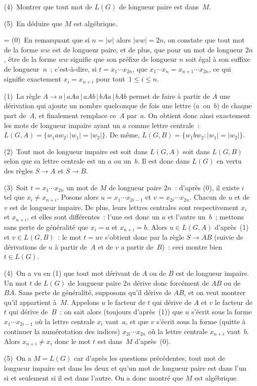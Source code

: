 \documentclass[12pt,a4paper]{article}
\theoremstyle{definition}
\newif\ifcorrige
\newenvironment{corrige}%
{\ifcorrige\relax\else\setbox0=\vbox\bgroup\fi%
\smallbreak\footnotesize\noindent{\underbar{\textit{Corrigé.}}\quad}}
{{\hbox{}\nobreak\hfill\checkmark}%
\ifcorrige\relax\else\egroup\fi\par}
\begin{document}
(4) Montrer que tout mot de $L(G)$ de longueur paire est dans $M$.

(5) En déduire que $M$ est algébrique.

\begin{corrige}
(0) En remarquant que si $n = |w|$ alors $|ww| = 2n$, on constate que
  tout mot de la forme $ww$ est de longueur paire, et de plus, que
  pour un mot de longueur $2n$, être de la forme $ww$ signifie que son
  préfixe de longueur $n$ soit égal à son suffixe de longueur $n$ ;
  c'est-à-dire, si $t = x_1\cdots x_{2n}$, que $x_1\cdots x_n =
  x_{n+1}\cdots x_{2n}$, ce qui signifie exactement $x_i = x_{n+i}$
  pour tout $1\leq i\leq n$.

(1) La règle $A \rightarrow a \,|\, aAa \,|\, aAb \,|\, bAa \,|\, bAb$
  permet de faire à partir de $A$ une dérivation qui ajoute un nombre
  quelconque de fois une lettre ($a$ ou $b$) de chaque part de $A$, et
  finalement remplace ce $A$ par $a$.  On obtient donc ainsi
  exactement les mots de longueur impaire ayant un $a$ comme lettre
  centrale : $L(G,A) = \{w_1aw_2 : |w_1|=|w_2|\}$.  De même, $L(G,B) =
  \{w_1bw_2 : |w_1|=|w_2|\}$.

(2) Tout mot de longueur impaire est soit dans $L(G,A)$ soit dans
  $L(G,B)$ selon que sa lettre centrale est un $a$ ou un $b$.  Il est
  donc dans $L(G)$ en vertu des règles $S\rightarrow A$ et
  $S\rightarrow B$.

(3) Soit $t = x_1\cdots x_{2n}$ un mot de $M$ de longueur paire $2n$ :
  d'après (0), il existe $i$ tel que $x_i \neq x_{n+i}$.  Posons alors
  $u = x_1\cdots x_{2i-1}$ et $v = x_{2i}\cdots x_{2n}$.  Chacun de
  $u$ et de $v$ est de longueur impaire.  De plus, leurs lettres
  centrales sont respectivement $x_i$ et $x_{n+i}$, et elles sont
  différentes : l'une est donc un $a$ et l'autre un $b$ ; mettons sans
  perte de généralité que $x_i = a$ et $x_{n+i} = b$.  Alors $u \in
  L(G,A)$ d'après (1) et $v \in L(G,B)$ : le mot $t = uv$ s'obtient
  donc par la règle $S \rightarrow AB$ (suivie de dérivations de $u$ à
  partir de $A$ et de $v$ a partir de $B$) : ceci montre bien $t \in
  L(G)$.

(4) On a vu en (1) que tout mot dérivant de $A$ ou de $B$ est de
  longueur impaire.  Un mot $t$ de $L(G)$ de longueur paire $2n$
  dérive donc forcément de $AB$ ou de $BA$.  Sans perte de généralité,
  supposons qu'il dérive de $AB$, et on veut montrer qu'il appartient
  à $M$.  Appelons $u$ le facteur de $t$ qui dérive de $A$ et $v$ le
  facteur de $t$ qui dérive de $B$ : on sait alors (toujours
  d'après (1)) que $u$ s'écrit sous la forme $x_1\cdots x_{2i-1}$ où
  la lettre centrale $x_i$ vaut $a$, et que $v$ s'écrit sous la forme
  (quitte à continuer la numérotation des indices) $x_{2i}\cdots
  x_{2n}$ où la lettre centrale $x_{n+i}$ vaut $b$.  Alors $x_{n+i}
  \neq x_i$ donc le mot $t$ est dans $M$ d'après (0).

(5) On a $M = L(G)$ car d'après les questions précédentes, tout mot de
  longueur impaire est dans les deux et qu'un mot de longueur paire
  est dans l'un si et seulement si il est dans l'autre.  On a donc
  montré que $M$ est algébrique.
\end{corrige}
\end{document}
